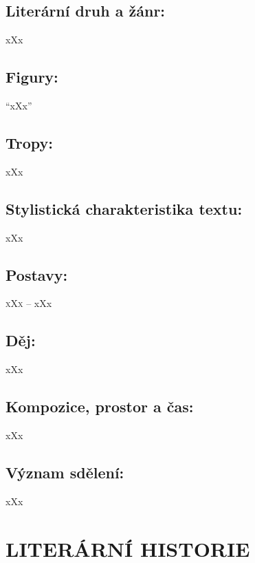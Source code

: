 \documentclass{extarticle} %
\begin{document}
\subsection*{Literární druh a žánr:}
\noindent xXx



\subsection*{Figury:}
\noindent 
\enquote{xXx}

\subsection*{Tropy:}
\noindent 
xXx

\subsection*{Stylistická charakteristika textu:}
\noindent 
xXx

\subsection*{Postavy:}
\noindent 
\textsc{xXx --} xXx \\

\subsection*{Děj:}
\noindent 
xXx

\subsection*{Kompozice, prostor a čas:}
\noindent 
xXx

\subsection*{Význam sdělení:}
\noindent 
xXx

\section*{LITERÁRNÍ HISTORIE}
\end{document}

